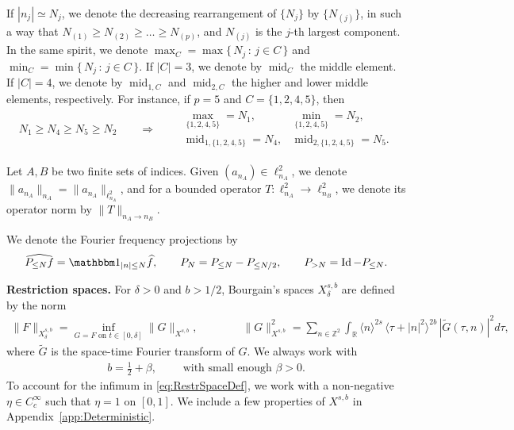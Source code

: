 \documentclass[11pt, xcolor = dvipsnames,reqno
]{amsart}
\theoremstyle{definition}
\theoremstyle{remark}
\begin{document}
    If $|n_j| \simeq N_j$, we denote the decreasing rearrangement of $\{N_j\}$ by $\{N_{(j)}\}$, in such a way that $N_{(1)} \geq N_{(2)} \geq \ldots \geq N_{(p)}$, and $N_{(j)}$ is the $j$-th largest component. 
    In the same spirit, we denote $\operatorname{max}_C = \operatorname{max} \{ \,  N_j \, : \, j \in C \, \}$ and $\operatorname{min}_C = \operatorname{min} \{ \,  N_j \, : \, j \in C \, \}$. 
    If $|C| = 3$, we denote by $\operatorname{mid}_C$ the middle element.
    If $|C| = 4$, we denote by $\operatorname{mid}_{1,C}$ and $\operatorname{mid}_{2,C}$ the higher and lower middle elements, respectively. For instance, if $p=5$ and $C = \{1,2,4,5\}$, then 
    \begin{align}
        N_1 \geq N_4 \geq N_5 \geq N_2
        \qquad \Longrightarrow \qquad 
        \begin{array}{ll}
            \operatorname{max}_{\{1,2,4,5\}} = N_1,  & \operatorname{min}_{\{1,2,4,5\}} = N_2,  \\
            \operatorname{mid}_{1, \{1,2,4,5\}} = N_4,  & \operatorname{mid}_{2, \{1,2,4,5\}} = N_5. 
        \end{array}
    \end{align}

    Let $A,B$ be two finite sets of indices. Given     $(a_{n_A}) \in \ell_{n_A}^2$, we denote $\|a_{n_A}\|_{n_A} = \|a_{n_A}\|_{\ell^2_{n_A}}$, 
    and for a bounded operator $T : \ell_{n_A}^2 \rightarrow \ell_{n_B}^2$, we denote its operator norm by $\|T\|_{n_A \rightarrow n_B}$. 
        
 We denote the Fourier frequency projections by
\begin{align}
    \widehat{P_{\leq N} f} = \mathbbm 1_{|n| \leq N} \widehat f, 
    \qquad 
    P_N = P_{\leq N} - 	P_{\leq N/2}, 
    \qquad 
    P_{>N} = \operatorname{Id} - P_{\leq N}.
\end{align}

    

\noindent
\textbf{Restriction spaces.}
For $\delta > 0$ and $b > 1/2$, Bourgain's spaces $X^{s,b}_{\delta}$ are defined by the norm
	\begin{align}\label{eq:RestrSpaceDef}
        \|F\|_{X^{s,b}_{\delta}} = \inf_{G = F \text{ on } t \in [0,\delta]} \|G\|_{X^{s,b}},
    \qquad \qquad 
		\|G\|^2_{X^{s,b}} = 
        \sum_{n \in \mathbb{Z}^2} \int_{\mathbb{R}}   \langle n \rangle^{2s} \, \langle \tau + |n|^2 \rangle^{2b} \,  |\widetilde{G}(\tau,n)|^2 d\tau,
	\end{align}
	where $\widetilde{G}$ is the space-time Fourier transform of $G$. 
    We always work with 
    \begin{align}
        b = \frac12 + \beta, \qquad \text{ with small enough } \beta > 0. 
    \end{align}
    To account for the infimum in \eqref{eq:RestrSpaceDef}, 
    we work with a non-negative $\eta \in C_c^\infty$ such that $\eta = 1$ on $[0,1]$.
    We include a few properties of $X^{s,b}$ in Appendix~\ref{app:Deterministic}. 
    
\end{document}
